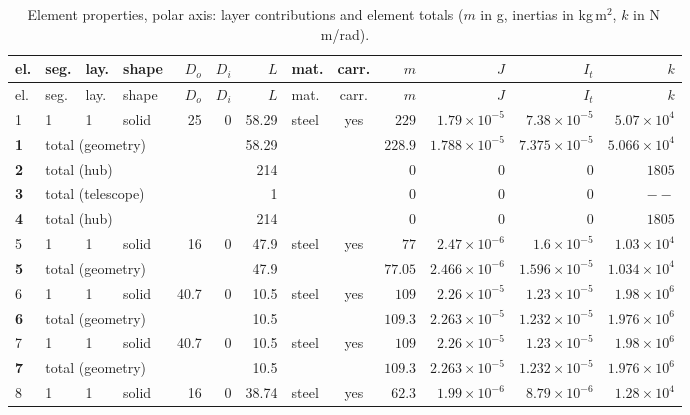 \documentclass[10pt,a4paper]{article}
\numberwithin{equation}{section}
\begin{document}
\begin{longtable}{llllrrrlcrrrr}
\caption{Element properties, polar axis: layer contributions and element totals ($m$ in g, inertias in kg\,m$^2$, $k$ in N\,m/rad).}\\
\toprule
el. & seg. & lay. & shape & $D_o$ & $D_i$ & $L$ & mat. & carr. & $m$ & $J$ & $I_t$ & $k$ \\
\midrule\endfirsthead
\toprule el. & seg. & lay. & shape & $D_o$ & $D_i$ & $L$ & mat. & carr. & $m$ & $J$ & $I_t$ & $k$ \\ \midrule\endhead
1 & 1 & 1 & solid & 25 & 0 & 58.29 & steel & yes & $229$ & $1.79\times10^{-5}$ & $7.38\times10^{-5}$ & $5.07\times10^{4}$ \\
\midrule \textbf{1} & \multicolumn{5}{l}{total (geometry)} & 58.29 & & & $228.9$ & $1.788\times10^{-5}$ & $7.375\times10^{-5}$ & $5.066\times10^{4}$ \\ \midrule
\midrule \textbf{2} & \multicolumn{5}{l}{total (hub)} & 214 & & & $0$ & $0$ & $0$ & $1805$ \\ \midrule
\midrule \textbf{3} & \multicolumn{5}{l}{total (telescope)} & 1 & & & $0$ & $0$ & $0$ & $--$ \\ \midrule
\midrule \textbf{4} & \multicolumn{5}{l}{total (hub)} & 214 & & & $0$ & $0$ & $0$ & $1805$ \\ \midrule
5 & 1 & 1 & solid & 16 & 0 & 47.9 & steel & yes & $77$ & $2.47\times10^{-6}$ & $1.6\times10^{-5}$ & $1.03\times10^{4}$ \\
\midrule \textbf{5} & \multicolumn{5}{l}{total (geometry)} & 47.9 & & & $77.05$ & $2.466\times10^{-6}$ & $1.596\times10^{-5}$ & $1.034\times10^{4}$ \\ \midrule
6 & 1 & 1 & solid & 40.7 & 0 & 10.5 & steel & yes & $109$ & $2.26\times10^{-5}$ & $1.23\times10^{-5}$ & $1.98\times10^{6}$ \\
\midrule \textbf{6} & \multicolumn{5}{l}{total (geometry)} & 10.5 & & & $109.3$ & $2.263\times10^{-5}$ & $1.232\times10^{-5}$ & $1.976\times10^{6}$ \\ \midrule
7 & 1 & 1 & solid & 40.7 & 0 & 10.5 & steel & yes & $109$ & $2.26\times10^{-5}$ & $1.23\times10^{-5}$ & $1.98\times10^{6}$ \\
\midrule \textbf{7} & \multicolumn{5}{l}{total (geometry)} & 10.5 & & & $109.3$ & $2.263\times10^{-5}$ & $1.232\times10^{-5}$ & $1.976\times10^{6}$ \\ \midrule
8 & 1 & 1 & solid & 16 & 0 & 38.74 & steel & yes & $62.3$ & $1.99\times10^{-6}$ & $8.79\times10^{-6}$ & $1.28\times10^{4}$ \\

\end{longtable}
\end{document}
